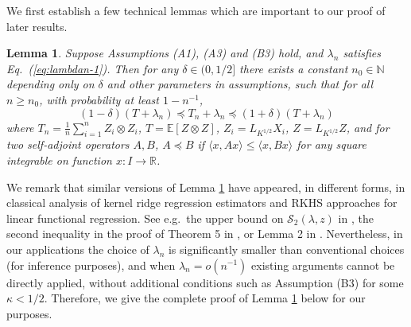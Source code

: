 \documentclass[11pt,a4paper]{article}
\theoremstyle{definition}
\theoremstyle{plain}
\newtheorem{lemma}{Lemma}[section]
\theoremstyle{remark}
\begin{document}
We first establish a few technical lemmas which are important to our proof of later results.
\begin{lemma}
Suppose Assumptions (A1), (A3) and (B3) hold, and $\lambda_n$ satisfies Eq.~(\ref{eq:lambdan-1}). Then for any $\delta\in(0,1/2]$ there exists a constant $n_0\in\mathbb N$ depending only on $\delta$ and other parameters in assumptions,
 such that for all $n\geq n_0$, with probability at least $1-n^{-1}$,
$$
(1-\delta)(T+\lambda_n)\preceq T_n+\lambda_n \preceq (1+\delta)(T+\lambda_n)
$$
where $T_n=\frac{1}{n}\sum_{i=1}^n Z_i\otimes Z_i$, $T=\mathbb E[Z\otimes Z]$, $Z_i=L_{K^{1/2}}X_i$, $Z=L_{K^{1/2}}Z$, and for two self-adjoint operators $A,B$, $A\preceq B$ if $\langle x,Ax\rangle\leq \langle x, Bx\rangle$
for any square integrable on function $x:I\to\mathbb R$.
\label{lem:empirical-population-cov}
\end{lemma}

We remark that similar versions of Lemma \ref{lem:empirical-population-cov} have appeared, in different forms, in classical analysis of kernel ridge regression estimators and RKHS approaches for linear functional regression.
See e.g.~the upper bound on $\mathcal S_2(\lambda,z)$ in \citep{caponnetto2007optimal}, the second inequality in the proof of Theorem 5 in \citep{smale2007learning}, or Lemma 2 in \citep{cai2012minimax}.
Nevertheless, in our applications the choice of $\lambda_n$ is significantly smaller than conventional choices (for inference purposes), and when $\lambda_n = o(n^{-1})$ existing arguments cannot be directly applied,
without additional conditions such as Assumption (B3) for some $\kappa<1/2$. Therefore, we give the complete proof of Lemma \ref{lem:empirical-population-cov} below for our purposes.
\end{document}
